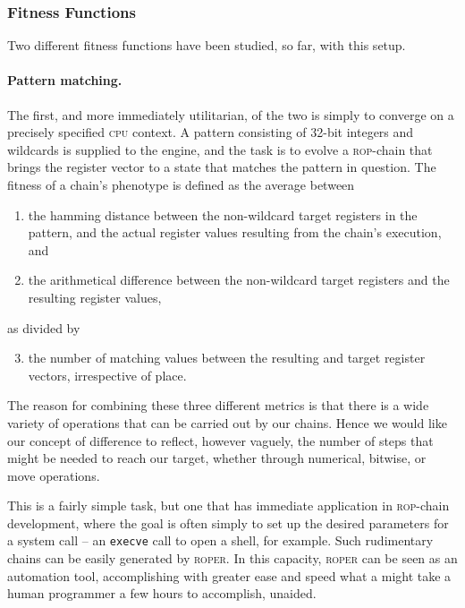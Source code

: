 \subsubsection{Fitness Functions}

Two different fitness functions have been studied, so far, with
this setup. 

\paragraph{Pattern matching.} The first, and more immediately
utilitarian, of the two is simply to converge on a precisely
specified \textsc{cpu} context. A pattern consisting of 32-bit
integers and wildcards is supplied to the engine, and the task is
to evolve a \textsc{rop}-chain that brings the register vector to
a state that matches the pattern in question. The fitness of a
chain's phenotype is defined as the average between
{\small
\begin{enumerate}
  
  \item the hamming distance between the non-wildcard target
    registers in the pattern, and the actual register values
    resulting from the chain's execution, and
  
  \item the arithmetical difference between the non-wildcard
    target registers and the resulting register values,

\end{enumerate} 
}
as divided by 
{\small
\begin{enumerate}
    \setcounter{enumi}{2}
  \item the number of matching values between the resulting
and target register vectors, irrespective of place.
\end{enumerate}
}
The reason
for combining these three different metrics is that there is a
wide variety of operations that can be carried out by our chains.
Hence we would like our concept of difference to reflect,
however vaguely, the number of steps that might be needed to
reach our target, whether through numerical, bitwise, or move
operations.

This is a fairly simple task, but one that has immediate
application in \textsc{rop}-chain development, where the goal is
often simply to set up the desired parameters for a system call
-- an \texttt{execve} call to open a shell, for example. Such
rudimentary chains can be easily generated by \textsc{roper}. 
In this capacity, \textsc{roper} can be seen as an automation
tool, accomplishing with greater ease and speed what a might take
a human programmer a few hours to accomplish, unaided. 

